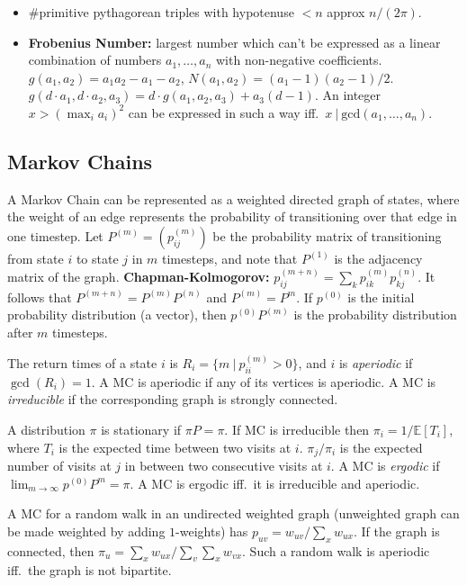 \documentclass[15pt,a4paper]{article}
\begin{document}
\begin{landscape}
\begin{multicols*}{3}
\begin{itemize}
    \item \#primitive pythagorean triples with hypotenuse $<n$ approx $n/(2\pi)$.
    \item \textbf{Frobenius Number:} largest number which can't be
    expressed as a linear combination of numbers $a_1,\ldots,a_n$
    with non-negative coefficients. $g(a_1,a_2) = a_1a_2-a_1-a_2$,
    $N(a_1,a_2)=(a_1-1)(a_2-1)/2$. $g(d\cdot a_1,d\cdot a_2,a_3) =
    d\cdot g(a_1,a_2,a_3) + a_3(d-1)$. An integer $x>\left(\max_i
    a_i\right)^2$ can be expressed in such a way iff.\ $x\ |\
    \mathrm{gcd}(a_1,\ldots,a_n)$.
\end{itemize}

\subsection{Markov Chains}
A Markov Chain can be represented as a weighted directed graph of
states, where the weight of an edge represents the probability of
transitioning over that edge in one timestep. Let $P^{(m)} = (p^{(m)}_{ij})$
be the probability matrix of transitioning from state $i$ to state $j$
in $m$ timesteps, and note that $P^{(1)}$ is the adjacency matrix of
the graph. \textbf{Chapman-Kolmogorov:} $p^{(m+n)}_{ij} = \sum_{k}
p^{(m)}_{ik} p^{(n)}_{kj}$. It follows that $P^{(m+n)} =
P^{(m)}P^{(n)}$ and $P^{(m)} = P^m$. If $p^{(0)}$ is the initial
probability distribution (a vector), then $p^{(0)}P^{(m)}$ is the
probability distribution after $m$ timesteps.

The return times of a state $i$ is $R_i = \{m\ |\ p^{(m)}_{ii} > 0 \}$,
and $i$ is \textit{aperiodic} if $\gcd(R_i) = 1$. A MC is aperiodic if
any of its vertices is aperiodic. A MC is \textit{irreducible} if the
corresponding graph is strongly connected.

A distribution $\pi$ is stationary if $\pi P = \pi$. If MC is
irreducible then $\pi_i = 1/\mathbb{E}[T_i]$, where $T_i$ is the
expected time between two visits at $i$. $\pi_j/\pi_i$ is the expected
number of visits at $j$ in between two consecutive visits at $i$. A MC
is \textit{ergodic} if $\lim_{m\to\infty} p^{(0)} P^{m} = \pi$. A MC is
ergodic iff.\ it is irreducible and aperiodic.

A MC for a random walk in an undirected weighted graph (unweighted
graph can be made weighted by adding $1$-weights) has $p_{uv} =
w_{uv}/\sum_{x} w_{ux}$. If the graph is connected, then $\pi_u =
\sum_{x} w_{ux} / \sum_{v}\sum_{x} w_{vx}$. Such a random walk is
aperiodic iff.\ the graph is not bipartite.


\end{multicols*}
\end{landscape}
\end{document}
